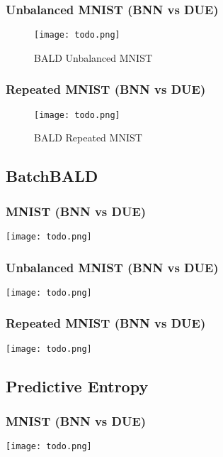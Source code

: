 \documentclass[12pt, a4paper]{report}
\theoremstyle{definition}
\theoremstyle{definition}
\theoremstyle{definition}
\begin{document}
\subsubsection{Unbalanced MNIST (BNN vs DUE)}

\begin{figure}[H]
\centering
\texttt{[image: todo.png]}
\caption{BALD Unbalanced MNIST}
\end{figure}

\subsubsection{Repeated MNIST (BNN vs DUE)}

\begin{figure}[H]
\centering
\texttt{[image: todo.png]}
\caption{BALD Repeated MNIST}
\end{figure}
    

\subsection{BatchBALD}

\subsubsection{MNIST (BNN vs DUE)}

\texttt{[image: todo.png]}

\subsubsection{Unbalanced MNIST (BNN vs DUE)}

\texttt{[image: todo.png]}

\subsubsection{Repeated MNIST (BNN vs DUE)}

\texttt{[image: todo.png]}


\subsection{Predictive Entropy}

\subsubsection{MNIST (BNN vs DUE)}

\texttt{[image: todo.png]}
\end{document}
